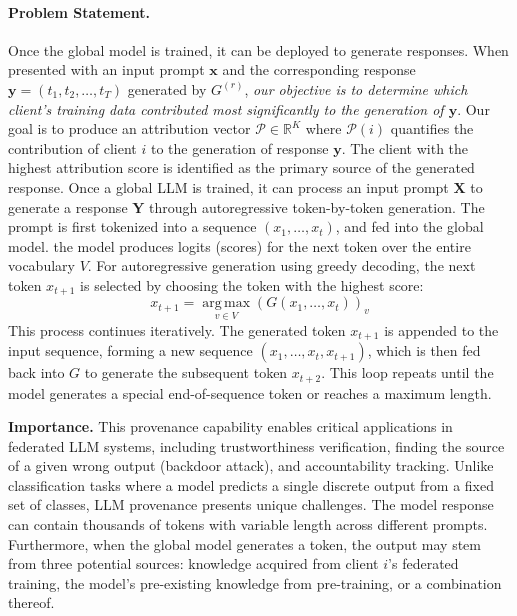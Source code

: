 \paragraph{Problem Statement.} Once the global model is trained, it can be deployed to generate responses.
When presented with an input prompt $\mathbf{x}$ and the corresponding response $\mathbf{y} = (t_1, t_2, \ldots, t_T)$ generated by $G^{(r)}$, \emph{our objective is to determine which client's training data contributed most significantly to the generation of $\mathbf{y}$}.
Our goal is to produce an attribution vector $\mathcal{P} \in \mathbb{R}^K$ where $\mathcal{P}(i)$ quantifies the contribution of client $i$ to the generation of response $\mathbf{y}$.
The client with the highest attribution score is identified as the primary source of the generated response. Once a global LLM is trained, it can process an input prompt $\mathbf{X}$ to generate a response $\mathbf{Y}$ through autoregressive token-by-token generation.
The prompt is first tokenized into a sequence $(x_1, \ldots, x_t)$, and fed into the global model. the model produces logits (scores) for the next token over the entire vocabulary $V$.
For autoregressive generation using greedy decoding, the next token $x_{t+1}$ is selected by choosing the token with the highest score:
\begin{equation}
  \label{eq:token-generation}
  x_{t+1} = \operatorname*{arg\,max}_{v \in V} \left( G(x_1, \ldots, x_t) \right)_v
\end{equation}
This process continues iteratively.
The generated token $x_{t+1}$ is appended to the input sequence, forming a new sequence $(x_1, \ldots, x_t, x_{t+1})$, which is then fed back into $G$ to generate the subsequent token $x_{t+2}$.
This loop repeats until the model generates a special end-of-sequence token or reaches a maximum length.

\textbf{Importance.} This provenance capability enables critical applications in federated LLM systems, including trustworthiness verification, finding the source of a given wrong output (\eg backdoor attack), and accountability tracking.
Unlike classification tasks where a model predicts a single discrete output from a fixed set of classes, LLM provenance presents unique challenges.
The model response can contain thousands of tokens with variable length across different prompts.
Furthermore, when the global model generates a token, the output may stem from three potential sources: knowledge acquired from client $i$'s federated training, the model's pre-existing knowledge from pre-training, or a combination thereof.

